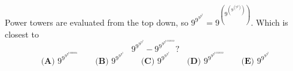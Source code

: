 Power towers are evaluated from the top down, so $9^{9^{9^{9^{9}}}}=9^{\left(9^{\left(9^{\left(9^9\right)}\right)}\right)}$. Which is closest to
\[9^{9^{9^{9^{9}}}}-9^{9^{9^{9^{8.9999999}}}}?\]
\[\textbf{(A) }9^{9^{9^{9^{0.0000001}}}}\qquad\textbf{(B) }9^{9^{9^{9^{3}}}}\qquad\textbf{(C) }9^{9^{9^{9^{7}}}}\qquad\textbf{(D) }9^{9^{9^{9^{8.9999999}}}}\qquad\textbf{(E) }9^{9^{9^{9^{9}}}}\]
